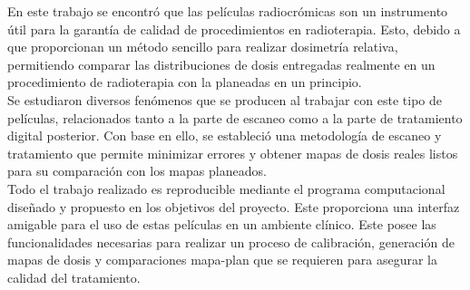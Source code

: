 En este trabajo se encontró que las películas radiocrómicas son un instrumento útil para la garantía de calidad de procedimientos en radioterapia. Esto, debido a que proporcionan un método sencillo para realizar dosimetría relativa, permitiendo comparar las distribuciones de dosis entregadas realmente en un procedimiento de radioterapia con la planeadas en un principio.\\

Se estudiaron diversos fenómenos que se producen al trabajar con este tipo de películas, relacionados tanto a la parte de escaneo como a la parte de tratamiento digital posterior. Con base en ello, se estableció una metodología de escaneo y tratamiento que permite minimizar errores y obtener mapas de dosis reales listos para su comparación con los mapas planeados.\\

Todo el trabajo realizado es reproducible mediante el programa computacional diseñado y propuesto en los objetivos del proyecto. Este proporciona una interfaz amigable para el uso de estas películas en un ambiente clínico. Este posee las funcionalidades necesarias para realizar un proceso de calibración, generación de mapas de dosis y comparaciones mapa-plan que se requieren para asegurar la calidad del tratamiento.\\